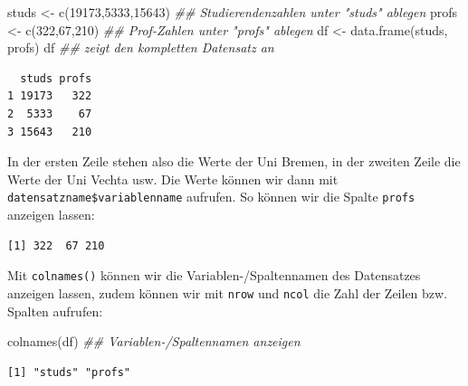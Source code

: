 \documentclass[
  letterpaper,
  DIV=11,
  numbers=noendperiod]{scrreprt}
\newenvironment{Shaded}{\begin{snugshade}}{\end{snugshade}}
\newcommand{\DecValTok}[1]{\textcolor[rgb]{0.68,0.00,0.00}{#1}}
\newcommand{\DocumentationTok}[1]{\textcolor[rgb]{0.37,0.37,0.37}{\textit{#1}}}
\newcommand{\FunctionTok}[1]{\textcolor[rgb]{0.28,0.35,0.67}{#1}}
\newcommand{\NormalTok}[1]{\textcolor[rgb]{0.00,0.46,0.62}{#1}}
\newcommand{\OtherTok}[1]{\textcolor[rgb]{0.00,0.46,0.62}{#1}}
\newcommand{\SpecialCharTok}[1]{\textcolor[rgb]{0.37,0.37,0.37}{#1}}
\begin{document}
\begin{Shaded}
\begin{Highlighting}[]
\NormalTok{studs }\OtherTok{\textless{}{-}} \FunctionTok{c}\NormalTok{(}\DecValTok{19173}\NormalTok{,}\DecValTok{5333}\NormalTok{,}\DecValTok{15643}\NormalTok{)    }\DocumentationTok{\#\# Studierendenzahlen unter "studs" ablegen }
\NormalTok{profs       }\OtherTok{\textless{}{-}} \FunctionTok{c}\NormalTok{(}\DecValTok{322}\NormalTok{,}\DecValTok{67}\NormalTok{,}\DecValTok{210}\NormalTok{)    }\DocumentationTok{\#\# Prof{-}Zahlen unter "profs" ablegen}
\NormalTok{df }\OtherTok{\textless{}{-}} \FunctionTok{data.frame}\NormalTok{(studs, profs)}
\NormalTok{df    }\DocumentationTok{\#\# zeigt den kompletten Datensatz an}
\end{Highlighting}
\end{Shaded}

\begin{verbatim}
  studs profs
1 19173   322
2  5333    67
3 15643   210
\end{verbatim}

In der ersten Zeile stehen also die Werte der Uni Bremen, in der zweiten
Zeile die Werte der Uni Vechta usw. Die Werte können wir dann mit
\texttt{datensatzname\$variablenname} aufrufen. So können wir die Spalte
\texttt{profs} anzeigen lassen:

\begin{Shaded}
\end{Shaded}

\begin{verbatim}
[1] 322  67 210
\end{verbatim}

Mit \texttt{colnames()} können wir die Variablen-/Spaltennamen des
Datensatzes anzeigen lassen, zudem können wir mit \texttt{nrow} und
\texttt{ncol} die Zahl der Zeilen bzw. Spalten aufrufen:

\begin{Shaded}
\begin{Highlighting}[]
\FunctionTok{colnames}\NormalTok{(df) }\DocumentationTok{\#\# Variablen{-}/Spaltennamen anzeigen}
\end{Highlighting}
\end{Shaded}

\begin{verbatim}
[1] "studs" "profs"
\end{verbatim}
\end{document}
